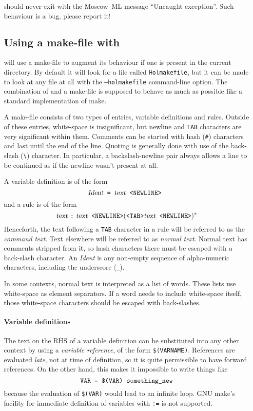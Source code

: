 \noindent \holmake{} should never exit with the Moscow~ML message ``Uncaught
exception''.  Such behaviour is a bug, please report it!


\subsection{Using a make-file with \holmake}
\label{sec:using-Holmakefiles}

\holmake{} will use a make-file to augment its behaviour if one is
present in the current directory.  By default it will look for a file
called \texttt{Holmakefile}, but it can be made to look at any file at
all with the \texttt{--holmakefile} command-line option.  The
combination of \holmake{} and a make-file is supposed to behave as
much as possible like a standard implementation of \textsf{make}.

A make-file consists of two types of entries, variable definitions and
rules.  Outside of these entries, white-space is insignificant, but
newline and \texttt{TAB} characters are very significant within them.
Comments can be started with hash (\texttt{\#}) characters and last
until the end of the line.  Quoting is generally done with use of the
back-slash (\verb+\+) character.  In particular, a backslash-newline
pair always allows a line to be continued as if the newline wasn't
present at all.

A variable definition is of the form
\[
\textsl{Ident} \texttt{ = } \textsl{text}  \texttt{ <NEWLINE> }
\]
and a rule is of the form
\[
\textsl{text } \texttt{:} \textsl{ text} \texttt{ <NEWLINE>}
(\texttt{<TAB>}\textsl{text}\texttt{ <NEWLINE>})^*
\]
Henceforth, the text following a \texttt{TAB} character in a rule will
be referred to as the \emph{command text}.  Text elsewhere will be
referred to as \emph{normal text}.  Normal text has comments stripped
from it, so hash characters there must be escaped with a back-slash
character.  An \textsl{Ident} is any non-empty sequence of
alpha-numeric characters, including the underscore (\texttt{\_}).

In some contexts, normal text is interpreted as a list of words.
These lists use white-space as element separators.  If a word needs to
include white-space itself, those white-space characters should be
escaped with back-slashes.

\newcommand{\varref}[1]{\texttt{\$(#1)}}
\paragraph{Variable definitions} The text on the RHS of a variable
definition can be substituted into any other context by using a
\emph{variable reference}, of the form \varref{VARNAME}.  References
are evaluated \emph{late}, not at time of definition, so it is quite
permissible to have forward references.  On the other hand, this makes
it impossible to write things like \[ \texttt{VAR = \varref{VAR}
something\_new}
\] because the evaluation of \varref{VAR} would lead to an infinite
loop. GNU \textsf{make}'s facility for immediate
definition of variables with \texttt{:=} is not supported.

